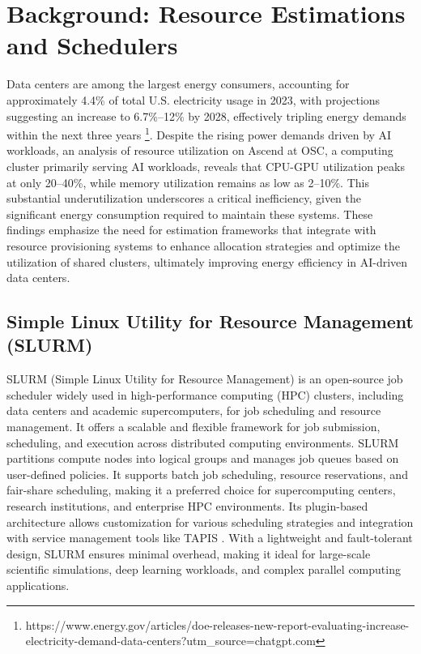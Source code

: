 \chapter{Background: Resource Estimations and Schedulers}
\label{Background.ch}

Data centers are among the largest energy consumers, accounting for approximately 4.4\% of total U.S. electricity usage in 2023, with projections suggesting an increase to 6.7\%–12\% by 2028, effectively tripling energy demands within the next three years \footnote{https://www.energy.gov/articles/doe-releases-new-report-evaluating-increase-electricity-demand-data-centers?utm_source=chatgpt.com}. Despite the rising power demands driven by AI workloads, an analysis of resource utilization on Ascend at OSC, a computing cluster primarily serving AI workloads, reveals that CPU-GPU utilization peaks at only 20–40\%, while memory utilization remains as low as 2–10\%. This substantial underutilization underscores a critical inefficiency, given the significant energy consumption required to maintain these systems. These findings emphasize the need for estimation frameworks that integrate with resource provisioning systems to enhance allocation strategies and optimize the utilization of shared clusters, ultimately improving energy efficiency in AI-driven data centers.

\section{Simple Linux Utility for Resource Management (SLURM)}
\label{sec:SLURM}
SLURM (Simple Linux Utility for Resource Management)\cite{jette2023architecture} is an open-source job scheduler widely used in high-performance computing (HPC) clusters, including data centers and academic supercomputers, for job scheduling and resource management. It offers a scalable and flexible framework for job submission, scheduling, and execution across distributed computing environments. SLURM partitions compute nodes into logical groups and manages job queues based on user-defined policies. It supports batch job scheduling, resource reservations, and fair-share scheduling, making it a preferred choice for supercomputing centers, research institutions, and enterprise HPC environments. Its plugin-based architecture allows customization for various scheduling strategies and integration with service management tools like TAPIS \cite{stubbs2021tapis}. With a lightweight and fault-tolerant design, SLURM ensures minimal overhead, making it ideal for large-scale scientific simulations, deep learning workloads, and complex parallel computing applications. 

